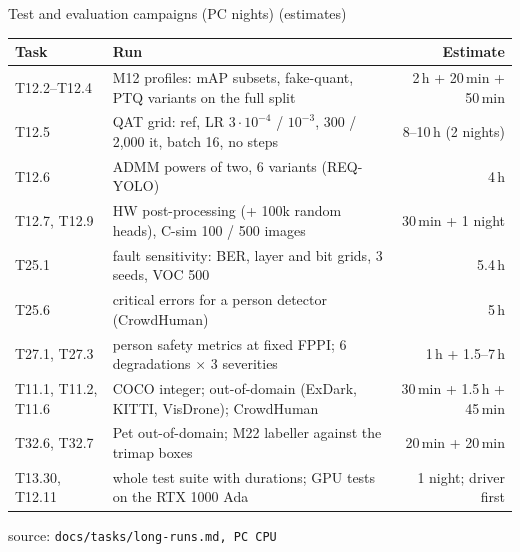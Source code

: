 \documentclass[aspectratio=169,11pt]{beamer}
\newcommand\src[1]{\par\vfill{\tiny\color{gray}source: \texttt{#1}}}
\newcommand\plan{\textcolor{orange!80!black}{\small(estimates)}}
\begin{document}
\begin{frame}{Test and evaluation campaigns (PC nights) \plan}
  \scriptsize
  \begin{tabularx}{\linewidth}{@{}l>{\raggedright\arraybackslash}Xr@{}}
    \toprule
    Task & Run & Estimate \\
    \midrule
    T12.2--T12.4 & M12 profiles: mAP subsets, fake-quant, PTQ variants on the full split & 2\,h + 20\,min + 50\,min \\
    T12.5 & QAT grid: ref, LR $3\cdot10^{-4}$ / $10^{-3}$, 300 / 2,000 it, batch 16, no steps & 8--10\,h (2 nights) \\
    T12.6 & ADMM powers of two, 6 variants (REQ-YOLO) & 4\,h \\
    T12.7, T12.9 & HW post-processing (+ 100k random heads), C-sim 100 / 500 images & 30\,min + 1 night \\
    T25.1 & fault sensitivity: BER, layer and bit grids, 3 seeds, VOC 500 & 5.4\,h \\
    T25.6 & critical errors for a person detector (CrowdHuman) & 5\,h \\
    T27.1, T27.3 & person safety metrics at fixed FPPI; 6 degradations $\times$ 3 severities & 1\,h + 1.5--7\,h \\
    T11.1, T11.2, T11.6 & COCO integer; out-of-domain (ExDark, KITTI, VisDrone); CrowdHuman & 30\,min + 1.5\,h + 45\,min \\
    T32.6, T32.7 & Pet out-of-domain; M22 labeller against the trimap boxes & 20\,min + 20\,min \\
    T13.30, T12.11 & whole test suite with durations; GPU tests on the RTX 1000 Ada & 1 night; driver first \\
    \bottomrule
  \end{tabularx}
  \src{docs/tasks/long-runs.md, PC CPU}
\end{frame}
\end{document}

